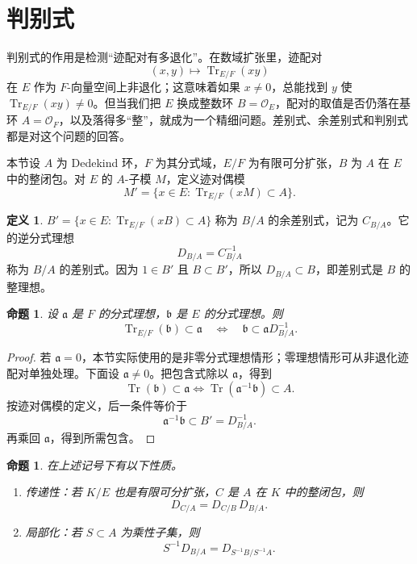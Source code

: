 \documentclass[11pt,a4paper,openany]{ctexbook}
\numberwithin{equation}{chapter}
\newcommand{\OF}{\mathcal{O}_F}
\newcommand{\Tr}{\operatorname{Tr}}
\theoremstyle{plain}
\newtheorem{proposition}[theorem]{命题}
\theoremstyle{definition}
\newtheorem{definition}[theorem]{定义}
\theoremstyle{remark}
\begin{document}
\section{判别式}

判别式的作用是检测“迹配对有多退化”。在数域扩张里，迹配对
\[
(x,y)\longmapsto \Tr_{E/F}(xy)
\]
在 $E$ 作为 $F$-向量空间上非退化；这意味着如果 $x\ne0$，总能找到 $y$ 使 $\Tr_{E/F}(xy)\ne0$。但当我们把 $E$ 换成整数环 $B=\mathcal O_E$，配对的取值是否仍落在基环 $A=\OF$，以及落得多“整”，就成为一个精细问题。差别式、余差别式和判别式都是对这个问题的回答。

本节设 $A$ 为 Dedekind 环，$F$ 为其分式域，$E/F$ 为有限可分扩张，$B$ 为 $A$ 在 $E$ 中的整闭包。对 $E$ 的 $A$-子模 $M$，定义迹对偶模
\[
M'=\{x\in E:\Tr_{E/F}(xM)\subset A\}.
\]

\begin{definition}
$B'= \{x\in E:\Tr_{E/F}(xB)\subset A\}$ 称为 $B/A$ 的余差别式，记为 $C_{B/A}$。它的逆分式理想
\[
D_{B/A}=C_{B/A}^{-1}
\]
称为 $B/A$ 的差别式。因为 $1\in B'$ 且 $B\subset B'$，所以 $D_{B/A}\subset B$，即差别式是 $B$ 的整理想。
\end{definition}

\begin{proposition}
设 $\mathfrak a$ 是 $F$ 的分式理想，$\mathfrak b$ 是 $E$ 的分式理想。则
\[
\Tr_{E/F}(\mathfrak b)\subset\mathfrak a
\quad\Longleftrightarrow\quad
\mathfrak b\subset\mathfrak a D_{B/A}^{-1}.
\]
\end{proposition}

\begin{proof}
若 $\mathfrak a=0$，本节实际使用的是非零分式理想情形；零理想情形可从非退化迹配对单独处理。下面设
$\mathfrak a\ne0$。把包含式除以 $\mathfrak a$，得到
\[
\Tr(\mathfrak b)\subset\mathfrak a
\Longleftrightarrow
\Tr(\mathfrak a^{-1}\mathfrak b)\subset A.
\]
按迹对偶模的定义，后一条件等价于
\[
\mathfrak a^{-1}\mathfrak b\subset B'=D_{B/A}^{-1}.
\]
再乘回 $\mathfrak a$，得到所需包含。
\end{proof}

\begin{proposition}
在上述记号下有以下性质。
\begin{enumerate}[label=(\arabic*)]
\item 传递性：若 $K/E$ 也是有限可分扩张，$C$ 是 $A$ 在 $K$ 中的整闭包，则
\[
D_{C/A}=D_{C/B}\,D_{B/A}.
\]
\item 局部化：若 $S\subset A$ 为乘性子集，则
\[
S^{-1}D_{B/A}=D_{S^{-1}B/S^{-1}A}.
\]
\end{enumerate}
\end{proposition}
\end{document}
